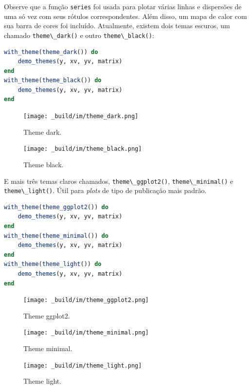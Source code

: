 \documentclass[
  notoc %
]{tufte-book}
\newcommand{\passthrough}[1]{#1}
\begin{document}
Observe que a função \passthrough{\lstinline!series!} foi usada para
plotar várias linhas e dispersões de uma só vez com seus rótulos
correspondentes. Além disso, um mapa de calor com sua barra de cores foi
incluído. Atualmente, existem dois temas escuros, um chamado
\passthrough{\lstinline!theme\_dark()!} e outro
\passthrough{\lstinline!theme\_black()!}:

\begin{lstlisting}[language=Julia]
with_theme(theme_dark()) do
    demo_themes(y, xv, yv, matrix)
end
with_theme(theme_black()) do
    demo_themes(y, xv, yv, matrix)
end
\end{lstlisting}

\begin{figure}
\hypertarget{fig:theme_dark}{%
\centering
\texttt{[image: \_build/im/theme\_dark.png]}
\caption{Theme dark.}\label{fig:theme_dark}
}
\end{figure}

\begin{figure}
\hypertarget{fig:theme_black}{%
\centering
\texttt{[image: \_build/im/theme\_black.png]}
\caption{Theme black.}\label{fig:theme_black}
}
\end{figure}

E mais três temas claros chamados,
\passthrough{\lstinline!theme\_ggplot2()!},
\passthrough{\lstinline!theme\_minimal()!} e
\passthrough{\lstinline!theme\_light()!}. Útil para \emph{plots} de tipo
de publicação mais padrão.

\begin{lstlisting}[language=Julia]
with_theme(theme_ggplot2()) do
    demo_themes(y, xv, yv, matrix)
end
with_theme(theme_minimal()) do
    demo_themes(y, xv, yv, matrix)
end
with_theme(theme_light()) do
    demo_themes(y, xv, yv, matrix)
end
\end{lstlisting}

\begin{figure}
\hypertarget{fig:theme_ggplot2}{%
\centering
\texttt{[image: \_build/im/theme\_ggplot2.png]}
\caption{Theme ggplot2.}\label{fig:theme_ggplot2}
}
\end{figure}

\begin{figure}
\hypertarget{fig:theme_minimal}{%
\centering
\texttt{[image: \_build/im/theme\_minimal.png]}
\caption{Theme minimal.}\label{fig:theme_minimal}
}
\end{figure}

\begin{figure}
\hypertarget{fig:theme_light}{%
\centering
\texttt{[image: \_build/im/theme\_light.png]}
\caption{Theme light.}\label{fig:theme_light}
}
\end{figure}
\end{document}
